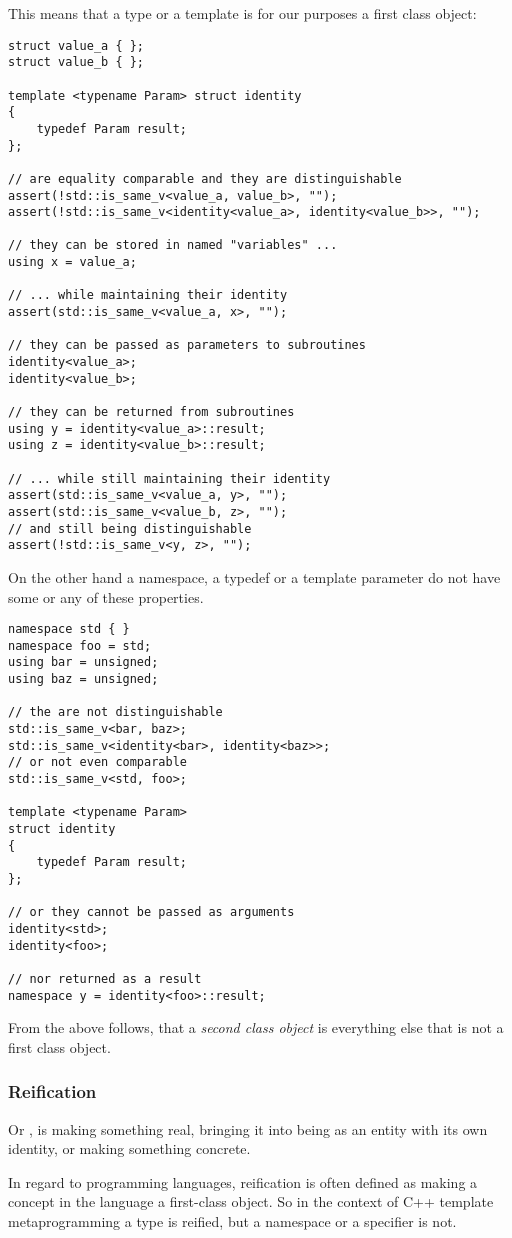 This means that a type or a template is for our purposes a first class object:

\begin{verbatim}
struct value_a { };
struct value_b { };

template <typename Param> struct identity
{
	typedef Param result;
};

// are equality comparable and they are distinguishable
assert(!std::is_same_v<value_a, value_b>, "");
assert(!std::is_same_v<identity<value_a>, identity<value_b>>, "");

// they can be stored in named "variables" ...
using x = value_a;

// ... while maintaining their identity
assert(std::is_same_v<value_a, x>, "");

// they can be passed as parameters to subroutines
identity<value_a>;
identity<value_b>;

// they can be returned from subroutines
using y = identity<value_a>::result;
using z = identity<value_b>::result;

// ... while still maintaining their identity
assert(std::is_same_v<value_a, y>, "");
assert(std::is_same_v<value_b, z>, "");
// and still being distinguishable
assert(!std::is_same_v<y, z>, "");
\end{verbatim}


On the other hand a namespace, a typedef or a template parameter do not have
some or any of these properties.

\begin{verbatim}
namespace std { }
namespace foo = std;
using bar = unsigned;
using baz = unsigned;

// the are not distinguishable
std::is_same_v<bar, baz>;
std::is_same_v<identity<bar>, identity<baz>>;
// or not even comparable
std::is_same_v<std, foo>;

template <typename Param>
struct identity
{
	typedef Param result;
};

// or they cannot be passed as arguments
identity<std>;
identity<foo>;

// nor returned as a result
namespace y = identity<foo>::result;
\end{verbatim}

From the above follows, that a {\em second class object} is everything else that
is not a first class object.

\subsubsection{Reification}
\label{term-reification}

Or , is making something real, bringing it into being as an
entity with its own identity, or making something concrete.

In regard to programming languages, reification is often defined as making
a concept in the language a first-class object. So in the context of C++ template
metaprogramming a type is reified, but a namespace or a specifier is not.

